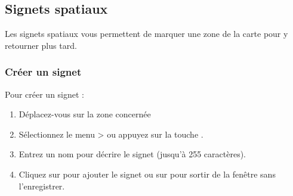 %
%
%

\subsection{Signets spatiaux}\label{sec:bookmarks}

Les signets spatiaux vous permettent de marquer une zone de la carte pour y retourner plus tard.

\subsubsection{Créer un signet}
Pour créer un signet :
\begin{enumerate}
\item Déplacez-vous sur la zone concernée
\item Sélectionnez le menu  >  ou appuyez sur la touche .
\item Entrez un nom pour décrire le signet (jusqu'à 255 caractères).
\item Cliquez sur  pour ajouter le signet ou sur  pour sortir de la fenêtre sans l'enregistrer.
\end{enumerate}

